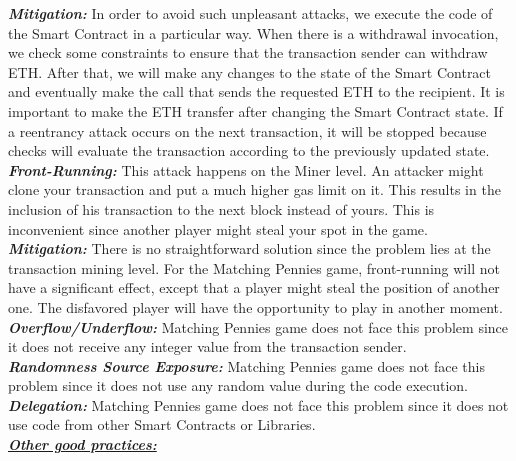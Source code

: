 \documentclass[12pt,a4paper]{article}
\begin{document}
\textbf{\emph{Mitigation: }}In order to avoid such unpleasant attacks, we execute the code of the
Smart Contract in a particular way. When there is a withdrawal invocation, we check
some constraints to ensure that the transaction sender can withdraw ETH. After that,
we will make any changes to the state of the Smart Contract and eventually make the call
that sends the requested ETH to the recipient. It is important to make the ETH transfer
after changing the Smart Contract state. If a reentrancy attack occurs on the next transaction,
it will be stopped because checks will evaluate the transaction according to the previously updated state. \\

\textbf{\emph{Front-Running: }}This attack happens on the Miner level. An attacker might clone your transaction
and put a much higher gas limit on it. This results in the inclusion of his transaction to the
next block instead of yours. This is inconvenient since another player might steal your spot in the game. \\

\textbf{\emph{Mitigation: }}There is no straightforward solution since the problem lies at the transaction mining level.
For the Matching Pennies game, front-running will not have a significant effect, except that a player
might steal the position of another one. The disfavored player will have the opportunity to play in another moment. \\

\textbf{\emph{Overflow/Underflow: }}Matching Pennies game does not face this problem since it does not receive any integer
value from the transaction sender. \\

\textbf{\emph{Randomness Source Exposure: }}Matching Pennies game does not face this problem since it does not use any
random value during the code execution. \\

\textbf{\emph{Delegation: }}Matching Pennies game does not face this problem since it does not use code
from other Smart Contracts or Libraries. \\

\textbf{\emph{\underline{Other good practices:}}} \\ 
\end{document}

